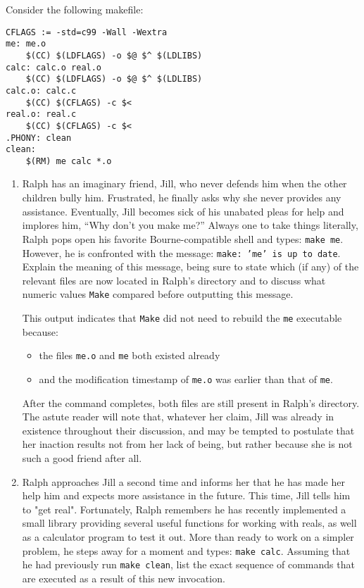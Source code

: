 Consider the following makefile:
\begin{lstlisting}
CFLAGS := -std=c99 -Wall -Wextra
me: me.o
    $(CC) $(LDFLAGS) -o $@ $^ $(LDLIBS)
calc: calc.o real.o
	$(CC) $(LDFLAGS) -o $@ $^ $(LDLIBS)
calc.o: calc.c
	$(CC) $(CFLAGS) -c $<
real.o: real.c
	$(CC) $(CFLAGS) -c $<
.PHONY: clean
clean:
	$(RM) me calc *.o
\end{lstlisting}

\begin{enumerate}
\item
Ralph has an imaginary friend, Jill, who never defends him when the other children bully him.
Frustrated, he finally asks why she never provides any assistance.
Eventually, Jill becomes sick of his unabated pleas for help and implores him, ``Why don't you make me?''
Always one to take things literally, Ralph pops open his favorite Bourne-compatible shell and types: \texttt{make me}.
However, he is confronted with the message: \texttt{make:\ 'me' is up to date}.
Explain the meaning of this message, being sure to state which (if any) of the relevant files are now located in Ralph's directory and to discuss what numeric values \texttt{Make} compared before outputting this message.

\begin{answer}
This output indicates that \texttt{Make} did not need to rebuild the \texttt{me} executable because:
\begin{itemize}
	\item the files \texttt{me.o} and \texttt{me} both existed already
	\item and the modification timestamp of \texttt{me.o} was earlier than that of \texttt{me}.
\end{itemize}
After the command completes, both files are still present in Ralph's directory.
The astute reader will note that, whatever her claim, Jill was already in existence throughout their discussion, and may be tempted to postulate that her inaction results not from her lack of being, but rather because she is not such a good friend after all.
\end{answer}

\item
Ralph approaches Jill a second time and informs her that he has made her help him and expects more assistance in the future.
This time, Jill tells him to "get real".
Fortunately, Ralph remembers he has recently implemented a small library providing several useful functions for working with reals, as well as a calculator program to test it out.
More than ready to work on a simpler problem, he steps away for a moment and types: \texttt{make calc}.
Assuming that he had previously run \texttt{make clean}, list the exact sequence of commands that are executed as a result of this new invocation.


\end{enumerate}
